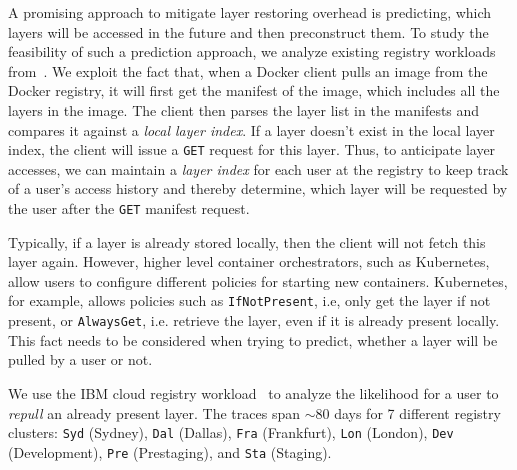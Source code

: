 
%
A promising approach to mitigate layer restoring overhead is predicting,
which layers will be accessed in the future and then preconstruct them.
%
%
To study the feasibility of such a prediction approach, we analyze
existing registry workloads from~\cite{dockerworkload}. %
%
We exploit the fact that, when a Docker client pulls an image
from the Docker registry, it will first get the manifest of the
image, which includes all the layers in the image.
%
The client then parses the layer list in the manifests
and compares it against a \emph{local layer index}.
%
If a layer doesn't exist in the local layer index, the client will issue a \texttt{GET}
request for this layer.
%
Thus, to anticipate layer accesses, we can maintain a \emph{layer index} for each user
at the registry to keep track of a user's access history and thereby determine, which layer
will be requested by the user after the \texttt{GET} manifest request.
%

Typically, if a layer is already stored locally, then the client will not
fetch this layer again.
%
However, higher level container orchestrators, such as Kubernetes, allow users to configure different policies
for starting new containers. Kubernetes, for example, allows policies such as
\texttt{IfNotPresent}, i.e,  only get the layer if not present, or \texttt{AlwaysGet}, i.e.
retrieve the layer, even if it is already present locally.
%
This fact needs to be considered when trying to predict, whether a layer will
be pulled by a user or not.

We use the IBM cloud registry workload~\cite{dockerworkload} to analyze the likelihood for
a user to \emph{repull} an already present layer.
%
The traces span $\sim$80 days for 7 different registry clusters:
\texttt{Syd} (Sydney), \texttt{Dal} (Dallas), \texttt{Fra} (Frankfurt), \texttt{Lon} (London),
\texttt{Dev} (Development), \texttt{Pre} (Prestaging), and \texttt{Sta} (Staging).
%

